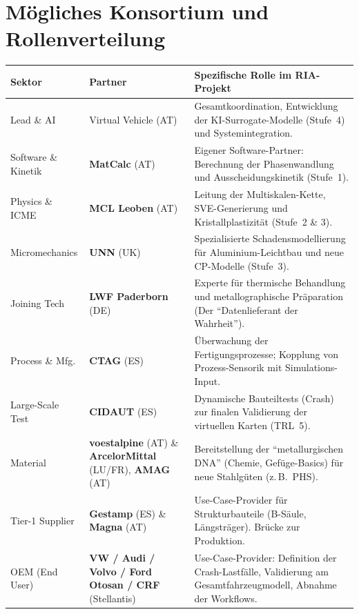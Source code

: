 \documentclass[12pt,a4paper]{article}
\begin{document}
\section{Mögliches Konsortium und Rollenverteilung}

\begin{longtable}{L{3cm} L{4cm} L{7.5cm}}
  \toprule
  \textbf{Sektor} & \textbf{Partner} & \textbf{Spezifische Rolle im
  RIA-Projekt} \\
  \midrule
  \endhead
  \bottomrule
  \endfoot

  Lead \& AI
    & Virtual Vehicle (AT)
    & Gesamtkoordination, Entwicklung der KI-Surrogate-Modelle (Stufe~4)
      und Systemintegration. \\[4pt]

  Software \& Kinetik
    & \textbf{MatCalc} (AT)
    & Eigener Software-Partner: Berechnung der Phasenwandlung und
      Ausscheidungskinetik (Stufe~1). \\[4pt]

  Physics \& ICME
    & \textbf{MCL Leoben} (AT)
    & Leitung der Multiskalen-Kette, SVE-Generierung und Kristallplastizität
      (Stufe~2 \& 3). \\[4pt]

  Micromechanics
    & \textbf{UNN} (UK)
    & Spezialisierte Schadensmodellierung für Aluminium-Leichtbau und neue
      CP-Modelle (Stufe~3). \\[4pt]

  Joining Tech
    & \textbf{LWF Paderborn} (DE)
    & Experte für thermische Behandlung und metallographische Präparation
      (Der "`Datenlieferant der Wahrheit"'). \\[4pt]

  Process \& Mfg.
    & \textbf{CTAG} (ES)
    & Überwachung der Fertigungsprozesse; Kopplung von Prozess-Sensorik mit
      Simulations-Input. \\[4pt]

  Large-Scale Test
    & \textbf{CIDAUT} (ES)
    & Dynamische Bauteiltests (Crash) zur finalen Validierung der virtuellen
      Karten (TRL~5). \\[4pt]

  Material
    & \textbf{voestalpine} (AT) \& \textbf{ArcelorMittal} (LU/FR),
      \textbf{AMAG} (AT)
    & Bereitstellung der "`metallurgischen DNA"' (Chemie, Gefüge-Basics) für
      neue Stahlgüten (z.\,B.\ PHS). \\[4pt]

  Tier-1 Supplier
    & \textbf{Gestamp} (ES) \& \textbf{Magna} (AT)
    & Use-Case-Provider für Strukturbauteile (B-Säule, Längsträger).
      Brücke zur Produktion. \\[4pt]

  OEM (End User)
    & \textbf{VW / Audi / Volvo / Ford Otosan / CRF} (Stellantis)
    & Use-Case-Provider: Definition der Crash-Lastfälle, Validierung am
      Gesamtfahrzeugmodell, Abnahme der Workflows. \\
\end{longtable}
\end{document}
